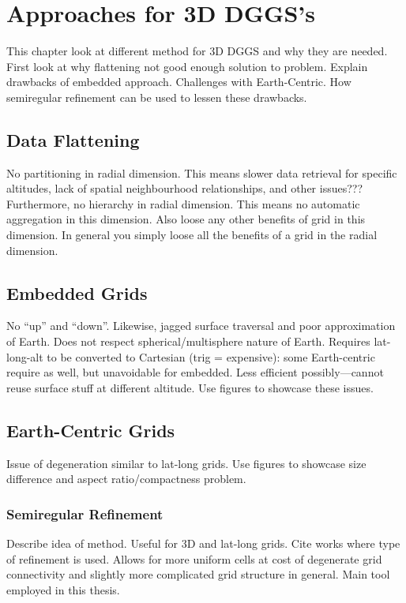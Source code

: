 \chapter{Approaches for 3D DGGS's} \label{chap:3ddggs}
This chapter look at different method for 3D DGGS and why they are needed.
First look at why flattening not good enough solution to problem.
Explain drawbacks of embedded approach.
Challenges with Earth-Centric.
How semiregular refinement can be used to lessen these drawbacks.


\section{Data Flattening}
No partitioning in radial dimension.
This means slower data retrieval for specific altitudes, lack of spatial neighbourhood relationships, and other issues???
Furthermore, no hierarchy in radial dimension.
This means no automatic aggregation in this dimension.
Also loose any other benefits of grid in this dimension.
In general you simply loose all the benefits of a grid in the radial dimension.


\section{Embedded Grids}
No ``up'' and ``down''.
Likewise, jagged surface traversal and poor approximation of Earth.
Does not respect spherical/multisphere nature of Earth.
Requires lat-long-alt to be converted to Cartesian (trig = expensive): some Earth-centric require as well, but unavoidable for embedded.
Less efficient possibly---cannot reuse surface stuff at different altitude.
Use figures to showcase these issues.


\section{Earth-Centric Grids}
Issue of degeneration similar to lat-long grids.
Use figures to showcase size difference and aspect ratio/compactness problem.


\subsection{Semiregular Refinement}
Describe idea of method.
Useful for 3D and lat-long grids.
Cite works where type of refinement is used.
Allows for more uniform cells at cost of degenerate grid connectivity and slightly more complicated grid structure in general.
Main tool employed in this thesis.

